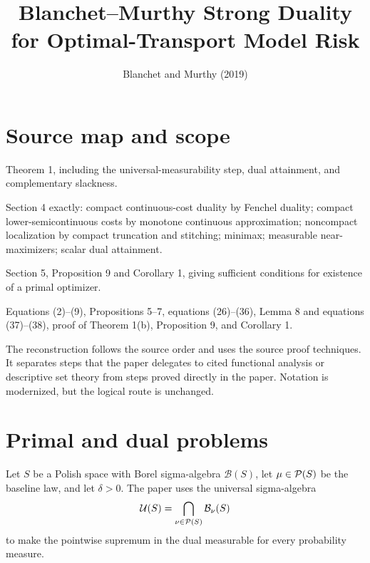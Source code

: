 
\title{Blanchet--Murthy Strong Duality for Optimal-Transport Model Risk}
\author{}
\date{Blanchet and Murthy (2019)}

\maketitle

\section*{Source map and scope}
\begin{sloppypar}
\begin{sourceguide}
\item[Primary source] 
\item[Target result] Theorem 1, including the universal-measurability step, dual attainment, and complementary slackness.
\item[Proof route] Section 4 exactly: compact continuous-cost duality by Fenchel duality; compact lower-semicontinuous costs by monotone continuous approximation; noncompact localization by compact truncation and stitching; minimax; measurable near-maximizers; scalar dual attainment.
\item[Additional result] Section 5, Proposition 9 and Corollary 1, giving sufficient conditions for existence of a primal optimizer.
\item[Anchors] Equations (2)--(9), Propositions 5--7, equations (26)--(36), Lemma 8 and equations (37)--(38), proof of Theorem 1(b), Proposition 9, and Corollary 1.
\end{sourceguide}
\end{sloppypar}

The reconstruction follows the source order and uses the source proof techniques.  It separates
steps that the paper delegates to cited functional analysis or descriptive set theory from steps
proved directly in the paper.  Notation is modernized, but the logical route is unchanged.

\section{Primal and dual problems}
Let $S$ be a Polish space with Borel sigma-algebra $\mathcal B(S)$, let $\mu\in\mathcal{P}(S)$ be the
baseline law, and let $\delta>0$.  The paper uses the universal sigma-algebra
\[
 \mathcal U(S)=\bigcap_{\nu\in\mathcal{P}(S)}\mathcal B_\nu(S)
\]
to make the pointwise supremum in the dual measurable for every probability measure.

